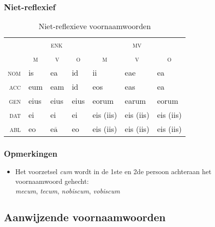 \documentclass[12pt,a4paper]{article}
\begin{document}
\subsubsection{Niet-reflexief}

\begin{table}[H]
\centering
\begin{tabular}{ r | l l l | l l l }
\toprule
 & \multicolumn{3}{c|}{\textsc{enk}} & \multicolumn{3}{c}{\textsc{mv}} \\
 & \multicolumn{1}{c}{\textsc{m}} & \multicolumn{1}{c}{\textsc{v}} & \multicolumn{1}{c|}{\textsc{o}} & \multicolumn{1}{c}{\textsc{m}} & \multicolumn{1}{c}{\textsc{v}} & \multicolumn{1}{c}{\textsc{o}} \\ 
\midrule
\textsc{nom} & is  & ea                     & id & ii    & eae       & ea \\
\textsc{acc} & eum & eam                    & id & eos   & eas       & ea \\
\textsc{gen} & eius   & eius                   & eius  & eorum & earum     & eorum \\
\textsc{dat} & ei   & ei                     & ei  & eis (iis)     & eis (iis) & eis (iis) \\
\textsc{abl} & eo  & e$\overline{\text{a}}$ & eo & eis (iis)     & eis (iis) & eis (iis) \\
\bottomrule
\end{tabular}
\caption{Niet-reflexieve voornaamwoorden}
\label{tab:ntreflvnw}
\end{table}

\subsubsection{Opmerkingen}

\begin{itemize}
    \item Het voorzetsel \emph{cum} wordt in de 1ste en 2de persoon achteraan het voornaamwoord gehecht: \\ \emph{mecum}, \emph{tecum}, \emph{nobiscum}, \emph{vobiscum}
\end{itemize}

\subsection{Aanwijzende voornaamwoorden}
\end{document}
